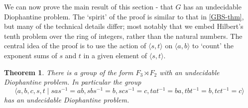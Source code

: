 \documentclass[11pt]{amsart}
\newtheorem{theorem}{Theorem}[section]
\theoremstyle{definition}
\numberwithin{theorem}{section}
\begin{document}
	We can now prove the main result of this section - that \(G\) has an
	undecidable Diophantine problem. The `spirit' of the proof is similar
	to that in \cref{GBS-thm}, but many of the technical details differ;
	most notably that we embed Hilbert's tenth problem over the ring of
	integers, rather than the natural numbers. The central idea of
	the proof is to use the action of \(\langle s, t \rangle\) on
	\(\langle a, b \rangle\) to `count' the exponent sums of
	\(s\) and \(t\) in a given element of \(\langle s, t \rangle\).

	\begin{theorem}\label{thm:FreeByFree}
		\label{F2byF2-thm}
	There is a group of the form $F_3 \rtimes F_2$ with an undecidable Diophantine problem. In particular the group
\[
\langle a, b,c, s, t \mid sas^{-1} = ab, sbs^{-1} = b, scs^{-1} = c, tat^{-1} = ba, tbt^{-1} = b, tct^{-1} = c \rangle
\]
has an undecidable Diophantine problem.	
	\end{theorem}
\end{document}
